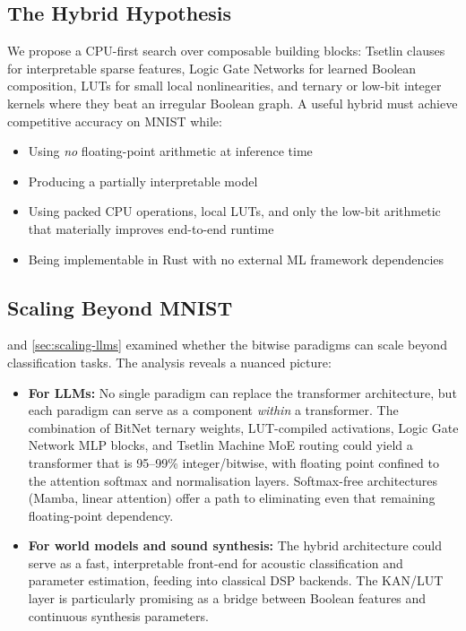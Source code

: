 \subsection{The Hybrid Hypothesis}

We propose a CPU-first search over composable building blocks: Tsetlin
clauses for interpretable sparse features, Logic Gate Networks for learned
Boolean composition, LUTs for small local nonlinearities, and ternary or
low-bit integer kernels where they beat an irregular Boolean graph. A
useful hybrid must achieve competitive accuracy on MNIST while:

\begin{itemize}[leftmargin=2em]
  \item Using \emph{no} floating-point arithmetic at inference time
  \item Producing a partially interpretable model
  \item Using packed CPU operations, local LUTs, and only the low-bit
    arithmetic that materially improves end-to-end runtime
  \item Being implementable in Rust with no external ML framework
    dependencies
\end{itemize}

\subsection{Scaling Beyond MNIST}

 and \cref{sec:scaling-llms} examined
whether the bitwise paradigms can scale beyond classification tasks.
The analysis reveals a nuanced picture:

\begin{itemize}[leftmargin=2em]
  \item \textbf{For LLMs:} No single paradigm can replace the
    transformer architecture, but each paradigm can serve as a
    component \emph{within} a transformer. The combination of BitNet
    ternary weights, LUT-compiled activations, Logic Gate Network
    MLP blocks, and Tsetlin Machine MoE routing could yield a
    transformer that is 95--99\% integer/bitwise, with floating point
    confined to the attention softmax and normalisation layers.
    Softmax-free architectures (Mamba, linear attention) offer a
    path to eliminating even that remaining floating-point dependency.

  \item \textbf{For world models and sound synthesis:} The hybrid
    architecture could serve as a fast, interpretable front-end for
    acoustic classification and parameter estimation, feeding into
    classical DSP backends. The KAN/LUT layer is particularly
    promising as a bridge between Boolean features and continuous
    synthesis parameters.
\end{itemize}

